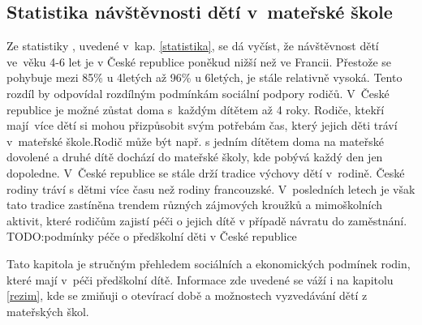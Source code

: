 			\subsection{Statistika návštěvnosti dětí v mateřské škole}
		
				Ze statistiky \cite{Eurydice}, uvedené v kap. \ref{statistika}, se dá vyčíst, že návštěvnost dětí ve věku 4-6 let je v České republice poněkud nižší než ve Francii. Přestože se pohybuje mezi 85\% u 4letých až 96\% u 6letých, je stále relativně vysoká. Tento rozdíl by odpovídal rozdílným podmínkám sociální podpory rodičů. V České republice je možné zůstat doma s každým dítětem až 4 roky. Rodiče, ktekří mají více dětí si mohou přizpůsobit svým potřebám čas, který jejich děti tráví v mateřské škole.Rodič může být např. s jedním dítětem doma na mateřské dovolené a druhé dítě dochází do mateřské školy, kde pobývá každý den jen dopoledne. V České republice se stále drží tradice výchovy dětí v rodině. České rodiny tráví s dětmi více času než rodiny francouzské. V posledních letech je však tato tradice zastíněna trendem různých zájmových kroužků a mimoškolních aktivit, které rodičům zajistí péči o jejich dítě v případě návratu do zaměstnání.  
				TODO:podmínky péče o předškolní děti v České republice	

				
	Tato kapitola je stručným přehledem sociálních a ekonomických podmínek rodin, které mají v péči předškolní dítě. Informace zde uvedené se váží i na kapitolu \ref{rezim}, kde se zmiňuji o otevírací době a možnostech vyzvedávání dětí z mateřských škol.

